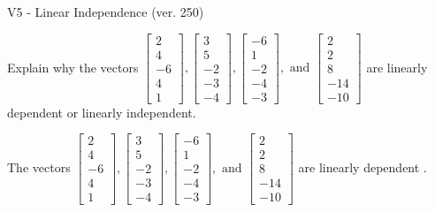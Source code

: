 \begin{exercise}
  \begin{exerciseTitle}V5 - Linear Independence (ver. 250)\end{exerciseTitle}
  \begin{exerciseStatement}
    Explain why the vectors \(\left[\begin{array}{r}
2 \\
4 \\
-6 \\
4 \\
1
\end{array}\right] , \left[\begin{array}{r}
3 \\
5 \\
-2 \\
-3 \\
-4
\end{array}\right] , \left[\begin{array}{r}
-6 \\
1 \\
-2 \\
-4 \\
-3
\end{array}\right] , \text{ and } \left[\begin{array}{r}
2 \\
2 \\
8 \\
-14 \\
-10
\end{array}\right]\) are linearly dependent or linearly independent.	


  \end{exerciseStatement}
  \begin{exerciseAnswer}
   The vectors \(\left[\begin{array}{r}
2 \\
4 \\
-6 \\
4 \\
1
\end{array}\right] , \left[\begin{array}{r}
3 \\
5 \\
-2 \\
-3 \\
-4
\end{array}\right] , \left[\begin{array}{r}
-6 \\
1 \\
-2 \\
-4 \\
-3
\end{array}\right] , \text{ and } \left[\begin{array}{r}
2 \\
2 \\
8 \\
-14 \\
-10
\end{array}\right]\) are 
  	 linearly dependent  .
  


  \end{exerciseAnswer}
\end{exercise}